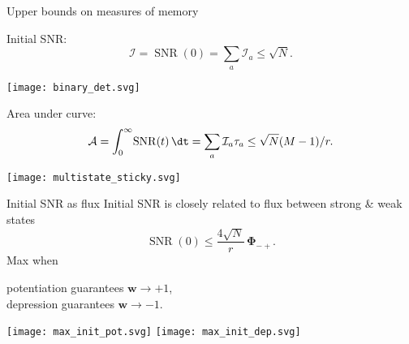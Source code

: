 \documentclass[final]{beamer}%
\DeclareMathOperator{\SNR}{SNR}
\DeclareMathOperator{\snr}{SNR}
\newcommand{\w}{\mathbf{w}}
\newcommand{\F}{\boldsymbol{\Phi}}
\newcommand{\initial}{\mathcal{I}}
\newcommand{\area}{\mathcal{A}}
\begin{document}

\begin{frame}{Upper bounds on measures of memory}
%
\parbox[t]{0.6\linewidth}{
 Initial SNR:
 \begin{equation*}
   \initial = \snr(0) = \sum_a \initial_a \leq \sqrt{N}.
 \end{equation*}
 \begin{center}
   \texttt{[image: binary\_det.svg]}
 \end{center}
 }
 \parbox[t]{0.39\linewidth}{
 } \par
 Area under curve:
 \begin{equation*}
   \area = \int_0^\infty \!\snr(t)\, \dt = \sum_a \initial_a \tau_a \leq \sqrt{N}(M-1)/r.
 \end{equation*}
 \begin{center}
   \texttt{[image: multistate\_sticky.svg]}
 \end{center}
%
\end{frame}


\begin{frame}{Initial SNR as flux}
%
 Initial SNR is closely related to flux between strong \& weak states
 \begin{equation*}
   \SNR(0) \leq \frac{4\sqrt{N}}{r}\,\F_{-+}.
 \end{equation*}
 Max when {\parbox[t]{8cm}{potentiation guarantees $\w\to+1$,\\
 depression guarantees $\w\to-1$.}}
 \begin{center}
   \texttt{[image: max\_init\_pot.svg]}
   \hp \hp
   \texttt{[image: max\_init\_dep.svg]}
 \end{center}
%
\end{frame}

\end{document}
